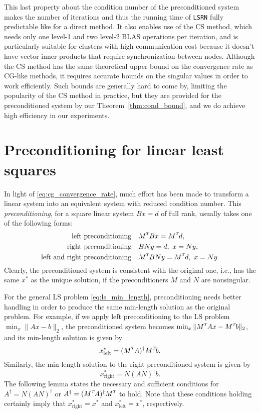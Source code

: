 \documentclass{siamltex}
\newcommand{\T}{^{\raisebox{0.09em}{\hbox{\tiny $T$}}\hspace{-0.1em}}}
\begin{document}
This last property about the condition number of the preconditioned system makes
the number of iterations and thus the running time of \texttt{LSRN} fully
predictable like for a direct method. It also enables use of the
CS method, which needs only one level-1 and two level-2
BLAS operations per iteration, and is particularly suitable for clusters with
high communication cost because it doesn't have vector inner products that
require synchronization between nodes.  Although the CS method has the same
theoretical upper bound on the convergence rate as CG-like methods, it requires
accurate bounds on the singular values in order to work efficiently.  Such
bounds are generally hard to come by, limiting the popularity of the CS method
in practice, but they are provided for the preconditioned system by our
Theorem~\ref{thm:cond_bound}, and we do achieve high efficiency in our
experiments.
 

\section{Preconditioning for linear least squares}
\label{sec:prec-line-least}

In light of \eqref{eq:cg_convergence_rate}, much effort has been made to
transform a linear system into an equivalent system with reduced condition
number. This \emph{preconditioning}, for a square linear system $B x = d$ of
full rank, usually takes one of the following forms:
\begin{align*}
  \label{eq:linear_precond}
  \text{left preconditioning} &\quad M\T B x = M\T d, \\
  \text{right preconditioning} &\quad B N y = d, ~ x = N y, \\
  \text{left and right preconditioning} &\quad M\T B N y = M\T d, ~ x = N y.
\end{align*}
Clearly, the preconditioned system is consistent with the original one, i.e.,
has the same $x^*$ as the unique solution, if the preconditioners $M$ and $N$
are nonsingular.

For the general LS problem \eqref{eq:ls_min_length}, preconditioning needs
better handling in order to produce the same min-length solution as the original
problem.  For example, if we apply left preconditioning to the LS problem
$\min_x \| A x - b \|_2$, the preconditioned system becomes $\min_x \| M\T A x -
M\T b \|_2$, and its min-length solution is given by
\begin{equation*}
  x^*_{\text{left}} = (M\T A)^\dagger M\T b.
\end{equation*}
Similarly, the min-length solution to the right preconditioned system is 
given by
\begin{equation*}
  x^*_{\text{right}} = N ( A N )^\dagger b.
\end{equation*}
The following lemma states the necessary and sufficient conditions for $A^\dagger
= N ( A N )^\dagger$ or $A^\dagger = ( M\T A )^\dagger M\T$ to hold. Note that
these conditions holding certainly imply that $x_{\text{right}}^* = x^*$ and
$x_{\text{left}}^* = x^*$, respectively.
\end{document}
